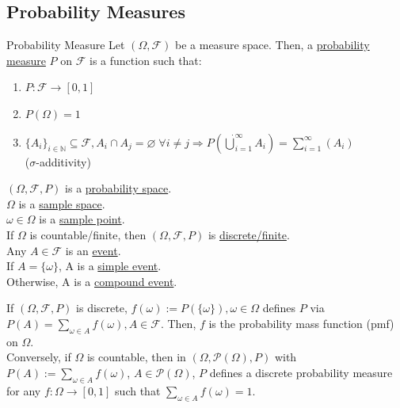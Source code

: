 \documentclass{article}
\begin{document}
	\newpage\subsection{Probability Measures}
	
	\begin{mydef}{Probability Measure}{}
		Let $(\Omega, \mathcal{F})$ be a measure space. Then, a \underline{probability measure} $P$ on $\mathcal{F}$ is a function such that:
		\begin{enumerate}[label=(\roman*)]
			\item $P : \mathcal{F}\to[0, 1]$
			\item $P(\Omega)=1$
			\item $\{A_i\}_{i\in\mathbb{N}}\subseteq\mathcal{F}, A_i\cap A_j=\varnothing\;\forall i\neq j\Rightarrow P(\dot\bigcup_{i=1}^{\infty}A_i)=\sum_{i=1}^{\infty}(A_i)$\\($\sigma$-additivity)
		\end{enumerate}
		
		$(\Omega, \mathcal{F}, P)$ is a \underline{probability space}.\\
		
		$\Omega$ is a \underline{sample space}.\\
		
		$\omega\in\Omega$ is a \underline{sample point}.\\
		
		If $\Omega$ is countable/finite, then $(\Omega, \mathcal{F}, P)$ is \underline{discrete/finite}.\\
		
		Any $A\in\mathcal{F}$ is an \underline{event}.\\
		
		If $A=\{\omega\}$, A is a \underline{simple event}.\\
		
		Otherwise, A is a \underline{compound event}.\\
	\end{mydef}
	
	\begin{myrem}{}{}
		If $(\Omega, \mathcal{F}, P)$ is discrete, $f(\omega):=P(\{\omega\}), \omega\in\Omega$ defines $P$ via $P(A)=\sum_{\omega\in A}f(\omega), A\in\mathcal{F}$. Then, $f$ is the probability mass function (pmf) on $\Omega$.\\
		
		Conversely, if $\Omega$ is countable, then in $(\Omega, \mathcal{P}(\Omega), P)$ with $P(A):=\sum_{\omega\in A}f(\omega)$, $A\in\mathcal{P}(\Omega)$, $P$ defines a discrete probability measure for any $f : \Omega\to[0, 1]$ such that $\sum_{\omega\in A}f(\omega)=1$.
	\end{myrem}
	
\end{document}
